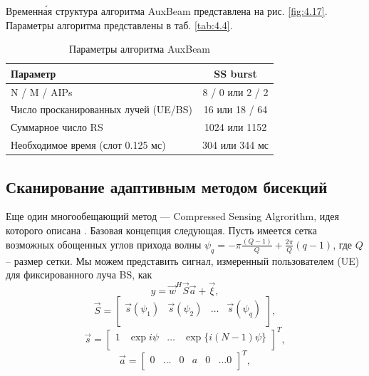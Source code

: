 Временн\'{а}я структура алгоритма AuxBeam представлена на рис. \ref{fig:4.17}. Параметры алгоритма представлены в таб. \ref{tab:4.4}.
\begin{table}
    \centering
    \caption{Параметры алгоритма AuxBeam}
    \label{tab:4.3}
    \begin{tabular}{|l|c|}
        \hline
        Параметр                             & SS burst        \\
        \hline
        N / M / AIPs                         & 8 / 0 или 2 / 2 \\
        Число просканированных лучей (UE/BS) & 16 или 18 / 64  \\
        Суммарное число RS                   & 1024 или 1152   \\
        Необходимое время (слот 0.125 мс)    & 304 или 344 мс  \\
        \hline
    \end{tabular}
\end{table}

\subsection{Сканирование адаптивным методом бисекций}

Еще один многообещающий метод —  Compressed Sensing Algrorithm, идея которого описана \cite{Alkhateeb2014}.
Базовая концепция следующая. Пусть имеется сетка возможных
обощенных углов прихода волны $\psi_q = - \pi\frac{(Q-1)}{Q} + \frac{2\pi}{Q} (q-1)$, где $Q$ -- размер сетки.
Мы можем представить сигнал, измеренный пользователем (UE) для фиксированного
луча BS, как
\begin{equation}
    \label{eq:4.42}
    y = \vec w^H\vec S \vec a + \vec \xi,
\end{equation}
\begin{equation}
    \label{eq:4.43}
    \vec S =
    \begin{bmatrix}
        \vec s(\psi_1) & \vec s(\psi_2) & \dots & \vec s(\psi_q) \\
    \end{bmatrix},
\end{equation}
\begin{equation}
    \label{eq:4.44}
    \vec s =
    \begin{bmatrix}
        1 & \exp{i\psi} & \dots & \exp\{ i(N-1)\psi\} \\
    \end{bmatrix}^T,
\end{equation}
\begin{equation}
    \label{eq:4.45}
    \vec a =
    \begin{bmatrix}
        0 & \dots & 0 & a & 0 & \dots 0 \\
    \end{bmatrix}^T,
\end{equation}


